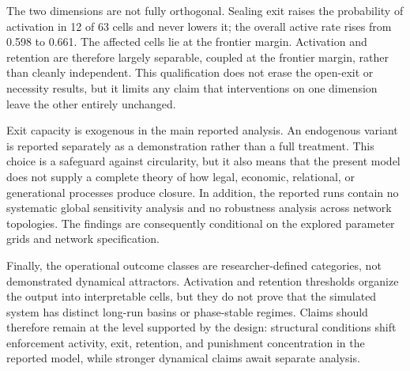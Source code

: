 The two dimensions are not fully orthogonal. Sealing exit raises the probability of activation in 12 of 63 cells and never lowers it; the overall active rate rises from 0.598 to 0.661. The affected cells lie at the frontier margin. Activation and retention are therefore largely separable, coupled at the frontier margin, rather than cleanly independent. This qualification does not erase the open-exit or necessity results, but it limits any claim that interventions on one dimension leave the other entirely unchanged.

Exit capacity is exogenous in the main reported analysis. An endogenous variant is reported separately as a demonstration rather than a full treatment. This choice is a safeguard against circularity, but it also means that the present model does not supply a complete theory of how legal, economic, relational, or generational processes produce closure. In addition, the reported runs contain no systematic global sensitivity analysis and no robustness analysis across network topologies. The findings are consequently conditional on the explored parameter grids and network specification.

Finally, the operational outcome classes are researcher-defined categories, not demonstrated dynamical attractors. Activation and retention thresholds organize the output into interpretable cells, but they do not prove that the simulated system has distinct long-run basins or phase-stable regimes. Claims should therefore remain at the level supported by the design: structural conditions shift enforcement activity, exit, retention, and punishment concentration in the reported model, while stronger dynamical claims await separate analysis.
